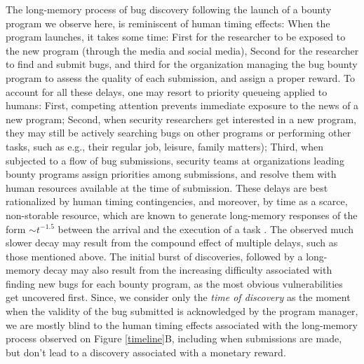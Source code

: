 The long-memory process of bug discovery following the launch of a bounty program we observe here, is reminiscent of human timing effects: When the program launches, it takes some time: First for the researcher to be exposed to the new program (through the media and social media), Second for the researcher to find and submit bugs, and third for the organization managing the bug bounty program to assess the quality of each submission, and assign a proper reward. To account for all these delays, one may resort to priority queueing applied to humans: First, competing attention prevents immediate exposure to the news of a new program; Second, when security researchers get interested in a new program, they may still be actively searching bugs on other programs or performing other tasks, such as e.g., their regular job, leisure, family matters); Third, when subjected to a flow of bug submissions, security teams at organizations leading bounty programs assign priorities among submissions, and resolve them with human resources available at the time of submission. These delays are best rationalized by human timing contingencies, and moreover, by time as a scarce, non-storable resource, which are known to generate long-memory responses of the form $\sim t^{-1.5}$ between the arrival and the execution of a task \cite{maillart2011quantification}. The observed much slower decay may result from the compound effect of multiple delays, such as those mentioned above. The initial burst of discoveries, followed by a long-memory decay may also result from the increasing difficulty associated with finding new bugs for each bounty program, as the most obvious vulnerabilities get uncovered first.  Since, we consider only the {\it time of discovery} as the moment when the validity of the bug submitted is acknowledged by the program manager, we are mostly blind to the human timing effects associated with the long-memory process observed on Figure \ref{timeline}B, including when submissions are made, but don't lead to a discovery associated with a monetary reward.\\



